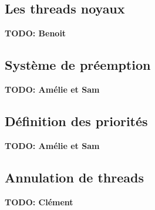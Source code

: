\subsection{Les threads noyaux}

\textbf{TODO: Benoit}



\subsection{Système de préemption}

\textbf{TODO: Amélie et Sam}



\subsection{Définition des priorités}

\textbf{TODO: Amélie et Sam}


\subsection{Annulation de threads}
\textbf{TODO: Clément}



